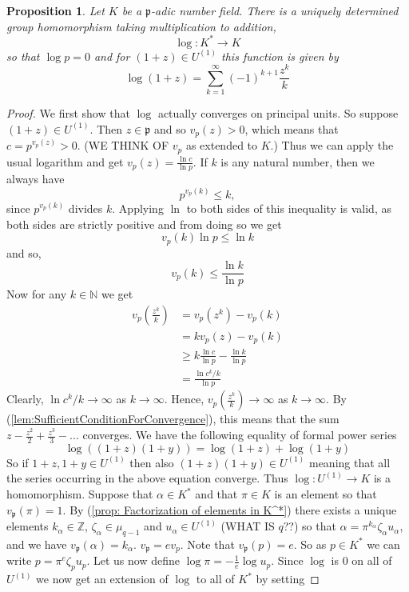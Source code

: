 \documentclass{article}
\newtheorem{proposition}{Proposition}[section]
\newcommand{\mfrak}[1]{\mathfrak{#1}}
\newcommand{\mbb}[1]{\mathbb{#1}}
\begin{document}
\begin{proposition}
    Let $K$ be a $\mfrak{p}$-adic number field. There is a uniquely determined group homomorphism taking multiplication to addition,
    $$\log : K^* \to K$$
    so that $\log p = 0$ and for $(1 + z) \in U^{(1)}$ this function is given by
    $$\log (1 + z) = \sum_{k = 1}^\infty (-1)^{k+1}\frac{z^k}{k}$$    
\end{proposition}
\begin{proof}
    We first show that $\log$ actually converges on principal units. So suppose $(1 + z) \in U^{(1)}$. Then $z \in \mfrak p$ and so $v_p(z) > 0$, which means that $c = p^{v_p(z)} > 0$. (WE THINK OF $v_p$ as extended to $K$.) Thus we can apply the usual logarithm and get $v_p(z) = \frac{\ln c}{\ln p}$. If $k$ is any natural number, then we always have $$p^{v_p(k)} \leq k,$$ since $p^{v_p(k)}$ divides $k$. Applying $\ln$ to both sides of this inequality is valid, as both sides are strictly positive and from doing so we get 
    $$v_p(k) \ln p \leq \ln k$$
    and so,
    $$v_p(k) \leq \frac{\ln k}{\ln p}$$
    Now for any $k \in \mbb N$ we get
    \begin{align*}
        v_p(\frac{z^k}{k}) &= v_p(z^k) - v_p(k)  \\
        &= kv_p(z) - v_p(k) \\
        &\geq k \frac{\ln c}{\ln p} - \frac{\ln k}{\ln p} \\
        &= \frac{\ln c^k / k}{\ln p}
    \end{align*}
    Clearly, $\ln c^k / k \to \infty$ as $k \to \infty$. Hence, $v_p(\frac{z^k}{k}) \to \infty$ as $k \to \infty$. By (\ref{lem:SufficientConditionForConvergence}), this means that the sum $z - \frac{z^2}{2} + \frac{z^3}{3} - ...$ converges. We have the following equality of formal power series
    $$\log((1+z)(1+y)) = \log(1+z) + \log(1+y)$$
    So if $1+z, 1+y \in U^{(1)}$ then also $(1+z)(1+y) \in U^{(1)}$ meaning that all the series occurring in the above equation converge. Thus $\log : U^{(1)} \to K$ is a homomorphism. Suppose that $\alpha \in K^*$ and that $\pi \in K$ is an element so that $v_\mfrak p(\pi) = 1$. By (\ref{prop: Factorization of elements in K^*}) there exists a unique elements $k_\alpha \in \mbb Z$, $\zeta_\alpha \in \mu_{q-1}$ and $u_\alpha \in U^{(1)}$ (WHAT IS $q$??) so that $\alpha = \pi^{k_\alpha} \zeta_\alpha u_\alpha$, and we have $v_\mfrak p(\alpha) = k_\alpha$. 
    $v_\mfrak p = e v_p$. Note that $v_{\mfrak p} (p) = e$. So as $p \in K^*$ we can write $p = \pi^{e}\zeta_p u_p$. Let us now define $\log \pi = -\frac{1}{e}\log u_p$. Since $\log$ is 0 on all of $U^{(1)}$ we now get an extension of $\log$ to all of $K^*$ by setting

\end{proof}
\end{document}
